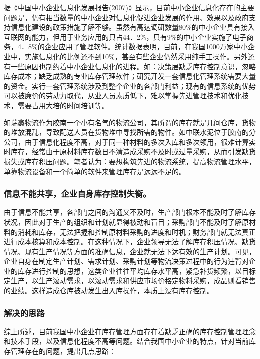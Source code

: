     据《中国中小企业信息化发展报告(2007)》显示，目前中小企业信息化存在的主要问题是，仍有相当数量的中小企业对信息化促进企业发展的作用、效果以及政府支持信息化建设的政策措施了解不够。虽然有高达调研数量80\%的中小企业具有接入互联网的能力，但用于业务应用的只占44．2\%，只有9\%的中小企业实施了电子商务，4．8\%的企业应用了管理软件。统计数据表明，目前，在我国1000万家中小企业中，实施信息化的比例还不到10\%，甚至有些企业仍然采用纯手工操作。另外还有一些原因也制约着中小企业信息化的进程。如：决策层缺乏库存控制意识，忽略库存成本；缺乏成熟的专业库存管理软件；研究开发一套信息化管理系统需要大量的资金。实行一套管理系统涉及到整个企业的各部门利益；现有的信息系统的优势可以被廉价的劳动力取代，从业人员素质低下，难以掌握先进管理技术和优化技术，需要占用大培的时间培训等。

    如瑞鑫物流作为胶南一个小有名气的物流公司，其所谓的库存就是几间仓库，货物的堆放混乱，导致配送人员在货物堆中寻找所需的物件。如中联水泥位于胶南的分公司，由于信息化程度不高，对于同一种材料的多次入库和多次领用，很难计算实时库存，经常由于原材料库存数日不清造成采购不及时或过量采购，从而引发缺货损失或库存积压问题。笔者认为：要想构筑先进的物流系统，提高物流管理水平，单靠物流设备和一个简单的软件来管理库存是远远不足的。

    \subsubsection { 信息不能共享，企业自身库存控制失衡。}

    由于信息不能共享，各部门之间的沟通又不及时，生产部门根本不能及时了解库存状况，因此对于生产的组织和计划就显得被动和盲目；采购部门不能及时了解原材料的消耗和库存，无法把握和控制原材料采购的进度和时机；财务部门就无法真正进行成本核算和成本控制。在这种情况下，企业领导无法了解库存积压情况、缺货情况、现有生产情况等方面的准确信息，企业就无法下达有效的生产计划。可见，企业自身在制定生产计划、需求计划、采购计划等物流决策过程中的行为违背对企业的库存进行控制的思想，这类企业往往平均库存水平高，紧急补货频繁，以目标定生产，以生产滚动需求，以滚动需求和供应市场价格定物料采购，成品则看销售的业绩。这样造成仓库被动发生出入库操作，本质上没有库存控制。

\subsubsection { 解决的思路}

    综上所述，目前我国中小企业在库存管理方面存在着缺乏正确的库存控制管理理念和技术手段，以及信息化程度不高等问题。结合我国中小企业的特点，针对当前库存管理存在的问题，提出几点思路：

